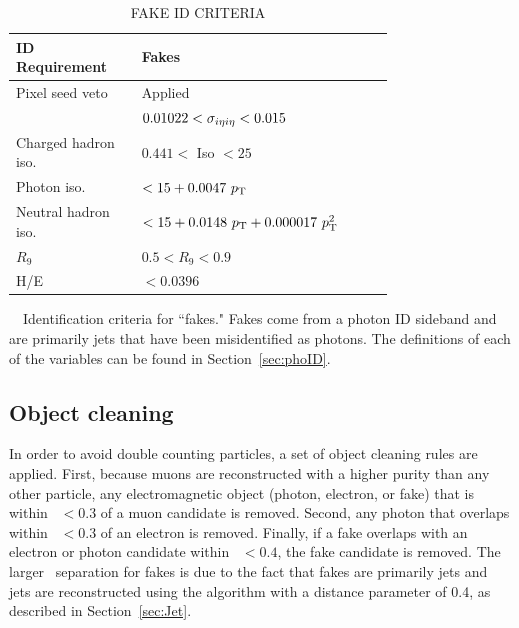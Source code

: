 \begin{table}[ht]
    \caption{FAKE ID CRITERIA}
    \centering
        \begin{threeparttable}
    \begin{tabular}{ |>{\centering\arraybackslash}m{0.25\linewidth}| >{\centering\arraybackslash}m{0.5\linewidth} |}
        \hline
        	\hline
        \textbf{ID Requirement} & \textbf{Fakes} \\ [0.5ex]
        \hline
        	Pixel seed veto    & Applied\\
	\hline
	\sigmaietaieta   & $0.01022 < \sigma_{i\eta i \eta}  < 0.015 $\\
	Charged hadron iso. & $ 0.441 <$ Iso $< 25$\\
	\hline
	Photon iso. &$ < 15 +0.0047~p_{\mathrm{T}}$\\
	Neutral hadron iso. & $< 15 + 0.0148~p_{\mathrm{T}}+0.000017~p_{\mathrm{T}}^2$\\
        $R_9$    & $0.5 < R_9 < 0.9$ \\
        H/E      & $ < 0.0396$\\
           \hline
           \hline
    \end{tabular}
    \label{tab:fakeID}
    \begin{tablenotes}
\footnotesize
\item{~~Identification criteria for ``fakes." Fakes come from a photon ID sideband and are primarily
    jets that have been misidentified as photons. The definitions of each of the variables can be found in 
    Section~\ref{sec:phoID}.}
    \end{tablenotes}
\end{threeparttable}
\end{table}

\subsection{Object cleaning}
\label{sec:ObjCleaning}

In order to avoid double counting particles, a set of object cleaning rules are applied. 
First, because muons are reconstructed with a higher purity than any other particle, 
any electromagnetic object (photon, electron, or fake) that is within \dR~$< 0.3$ of a muon candidate is removed.
Second, any photon that overlaps within \dR~$< 0.3$ of an electron is removed. Finally, if a fake overlaps with an electron or 
photon candidate within \dR~$< 0.4$, the fake candidate is removed. The larger \dR~separation for fakes is due to the fact
that fakes are primarily jets and jets are reconstructed using the \antikt algorithm with a distance
parameter of 0.4, as described in Section~\ref{sec:Jet}.  

